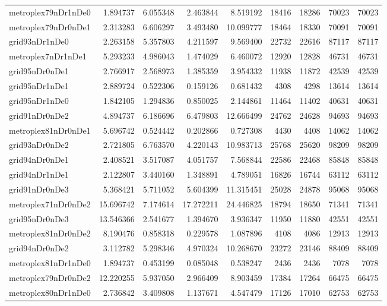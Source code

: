 \begin{longtable}{|l|r|r|r|r|r|r|r|r|}
metroplex79nDr1nDe0 & 1.894737 & 6.055348 & 2.463844 & 8.519192 & 18416 & 18286 & 70023 & 70023 \\
metroplex79nDr0nDe1 & 2.313283 & 6.606297 & 3.493480 & 10.099777 & 18464 & 18330 & 70091 & 70091 \\
grid93nDr1nDe0 & 2.263158 & 5.357803 & 4.211597 & 9.569400 & 22732 & 22616 & 87117 & 87117 \\
metroplex7nDr1nDe1 & 5.293233 & 4.986043 & 1.474029 & 6.460072 & 12920 & 12828 & 46731 & 46731 \\
grid95nDr0nDe1 & 2.766917 & 2.568973 & 1.385359 & 3.954332 & 11938 & 11872 & 42539 & 42539 \\
grid95nDr1nDe1 & 2.889724 & 0.522306 & 0.159126 & 0.681432 & 4308 & 4298 & 13614 & 13614 \\
grid95nDr1nDe0 & 1.842105 & 1.294836 & 0.850025 & 2.144861 & 11464 & 11402 & 40631 & 40631 \\
grid91nDr0nDe2 & 4.894737 & 6.186696 & 6.479803 & 12.666499 & 24762 & 24628 & 94693 & 94693 \\
metroplex81nDr0nDe1 & 5.696742 & 0.524442 & 0.202866 & 0.727308 & 4430 & 4408 & 14062 & 14062 \\
grid93nDr0nDe2 & 2.721805 & 6.763570 & 4.220143 & 10.983713 & 25768 & 25620 & 98209 & 98209 \\
grid94nDr0nDe1 & 2.408521 & 3.517087 & 4.051757 & 7.568844 & 22586 & 22468 & 85848 & 85848 \\
grid94nDr1nDe1 & 2.122807 & 3.440160 & 1.348891 & 4.789051 & 16826 & 16744 & 63112 & 63112 \\
grid91nDr0nDe3 & 5.368421 & 5.711052 & 5.604399 & 11.315451 & 25028 & 24878 & 95068 & 95068 \\
metroplex71nDr0nDe2 & 15.696742 & 7.174614 & 17.272211 & 24.446825 & 18794 & 18650 & 71341 & 71341 \\
grid95nDr0nDe3 & 13.546366 & 2.541677 & 1.394670 & 3.936347 & 11950 & 11880 & 42551 & 42551 \\
metroplex81nDr0nDe2 & 8.190476 & 0.858318 & 0.229578 & 1.087896 & 4108 & 4086 & 12913 & 12913 \\
grid94nDr0nDe2 & 3.112782 & 5.298346 & 4.970324 & 10.268670 & 23272 & 23146 & 88409 & 88409 \\
metroplex81nDr1nDe0 & 1.894737 & 0.453199 & 0.085048 & 0.538247 & 2436 & 2436 & 7078 & 7078 \\
metroplex79nDr0nDe2 & 12.220255 & 5.937050 & 2.966409 & 8.903459 & 17384 & 17264 & 66475 & 66475 \\
metroplex80nDr1nDe0 & 2.736842 & 3.409808 & 1.137671 & 4.547479 & 17126 & 17010 & 62753 & 62753 \\

\end{longtable}
